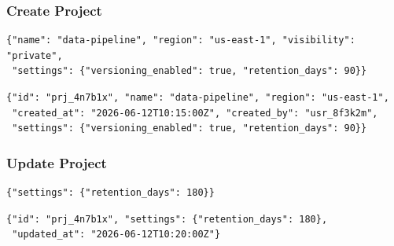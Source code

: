 \documentclass[
    language=english,
    doctype=article,
    institution=none,
]{../../omnilatex}
\begin{document}
\subsubsection{Create Project}
\begin{reqbox}
\begin{verbatim}
{"name": "data-pipeline", "region": "us-east-1", "visibility": "private",
 "settings": {"versioning_enabled": true, "retention_days": 90}}
\end{verbatim}
\end{reqbox}
\begin{resbox}[201 Created]
\begin{verbatim}
{"id": "prj_4n7b1x", "name": "data-pipeline", "region": "us-east-1",
 "created_at": "2026-06-12T10:15:00Z", "created_by": "usr_8f3k2m",
 "settings": {"versioning_enabled": true, "retention_days": 90}}
\end{verbatim}
\end{resbox}

\subsubsection{Update Project}
\begin{reqbox}
\begin{verbatim}
{"settings": {"retention_days": 180}}
\end{verbatim}
\end{reqbox}
\begin{resbox}[200 OK]
\begin{verbatim}
{"id": "prj_4n7b1x", "settings": {"retention_days": 180},
 "updated_at": "2026-06-12T10:20:00Z"}
\end{verbatim}
\end{resbox}
\end{document}
